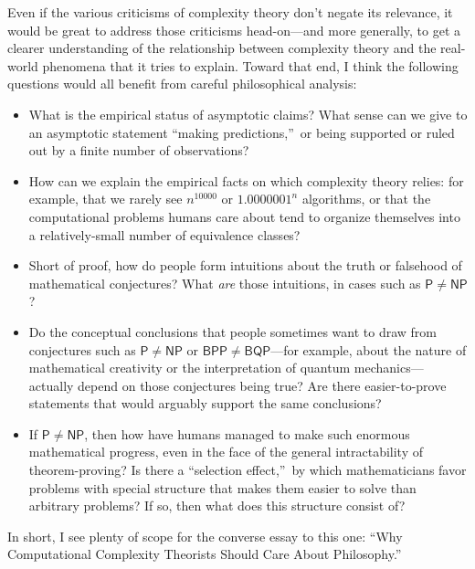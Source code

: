 \documentclass[12pt,onecolumn]{article}%
\begin{document}
Even if the various criticisms of complexity theory don't negate its
relevance, it would be great to address those criticisms head-on---and more
generally, to get a clearer understanding of the relationship between
complexity theory and the real-world phenomena that it tries to explain.
 Toward that end, I think the following questions would all benefit from
careful philosophical analysis:

\begin{itemize}
\item What is the empirical status of asymptotic claims? What sense can we
give to an asymptotic statement \textquotedblleft making
predictions,\textquotedblright\  or being supported or ruled out by a finite
number of observations?

\item How can we explain the empirical facts on which complexity theory
relies: for example, that we rarely see $n^{10000}$ or $1.0000001^{n}$
algorithms, or that the computational problems humans care about tend to
organize themselves into a relatively-small number of equivalence classes?

\item Short of proof, how do people form intuitions about the truth or
falsehood of mathematical conjectures? What \textit{are} those intuitions,
in cases such as $\mathsf{P}\neq\mathsf{NP}$?

\item Do the conceptual conclusions that people sometimes want to draw from
conjectures such as $\mathsf{P}\neq\mathsf{NP}$ or $\mathsf{BPP}%
\neq\mathsf{BQP}$---for example, about the nature of mathematical creativity
or the interpretation of quantum mechanics---actually depend on those
conjectures being true? Are there easier-to-prove statements that would
arguably support the same conclusions?

\item If $\mathsf{P}\neq\mathsf{NP}$, then how have humans managed to make
such enormous mathematical progress, even in the face of the general
intractability of theorem-proving? Is there a \textquotedblleft selection
effect,\textquotedblright\  by which mathematicians favor problems with special
structure that makes them easier to solve than arbitrary problems? If so,
then what does this structure consist of?
\end{itemize}

In short, I see plenty of scope for the converse essay to this one:
\textquotedblleft Why Computational Complexity Theorists Should Care About
Philosophy.\textquotedblright\ 
\end{document}
